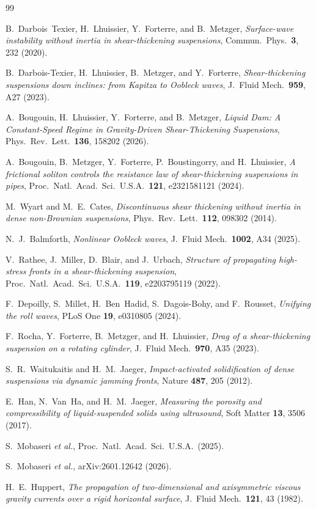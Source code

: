 \documentclass[aps,preprint,superscriptaddress,longbibliography]{revtex4-2}
\begin{document}
\begin{thebibliography}{99}

B.~Darbois~Texier, H.~Lhuissier, Y.~Forterre, and B.~Metzger,
\textit{Surface-wave instability without inertia in shear-thickening suspensions},
Commun.\ Phys.\ \textbf{3}, 232 (2020).

B.~Darbois-Texier, H.~Lhuissier, B.~Metzger, and Y.~Forterre,
\textit{Shear-thickening suspensions down inclines: from Kapitza to Oobleck waves},
J.\ Fluid Mech.\ \textbf{959}, A27 (2023).

A.~Bougouin, H.~Lhuissier, Y.~Forterre, and B.~Metzger,
\textit{Liquid Dam: A Constant-Speed Regime in Gravity-Driven
Shear-Thickening Suspensions},
Phys.\ Rev.\ Lett.\ \textbf{136}, 158202 (2026).

A.~Bougouin, B.~Metzger, Y.~Forterre, P.~Boustingorry, and H.~Lhuissier,
\textit{A frictional soliton controls the resistance law of
shear-thickening suspensions in pipes},
Proc.\ Natl.\ Acad.\ Sci.\ U.S.A.\ \textbf{121}, e2321581121 (2024).

M.~Wyart and M.~E.~Cates,
\textit{Discontinuous shear thickening without inertia in dense
non-Brownian suspensions},
Phys.\ Rev.\ Lett.\ \textbf{112}, 098302 (2014).

N.~J.~Balmforth,
\textit{Nonlinear Oobleck waves},
J.\ Fluid Mech.\ \textbf{1002}, A34 (2025).

V.~Rathee, J.~Miller, D.~Blair, and J.~Urbach,
\textit{Structure of propagating high-stress fronts in a
shear-thickening suspension},
Proc.\ Natl.\ Acad.\ Sci.\ U.S.A.\ \textbf{119}, e2203795119 (2022).

F.~Depoilly, S.~Millet, H.~Ben~Hadid, S.~Dagois-Bohy, and F.~Rousset,
\textit{Unifying the roll waves},
PLoS One \textbf{19}, e0310805 (2024).

F.~Rocha, Y.~Forterre, B.~Metzger, and H.~Lhuissier,
\textit{Drag of a shear-thickening suspension on a rotating cylinder},
J.\ Fluid Mech.\ \textbf{970}, A35 (2023).

S.~R.~Waitukaitis and H.~M.~Jaeger,
\textit{Impact-activated solidification of dense suspensions via dynamic
jamming fronts},
Nature \textbf{487}, 205 (2012).

E.~Han, N.~Van~Ha, and H.~M.~Jaeger,
\textit{Measuring the porosity and compressibility of liquid-suspended
solids using ultrasound},
Soft Matter \textbf{13}, 3506 (2017).

S.~Mobaseri \textit{et al.},
Proc.\ Natl.\ Acad.\ Sci.\ U.S.A.\ (2025).

S.~Mobaseri \textit{et al.},
arXiv:2601.12642 (2026).

H.~E.~Huppert,
\textit{The propagation of two-dimensional and axisymmetric viscous
gravity currents over a rigid horizontal surface},
J.\ Fluid Mech.\ \textbf{121}, 43 (1982).

\end{thebibliography}
\end{document}

